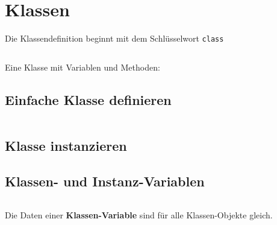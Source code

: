 
\begin{minipage}[t]{0.59\textwidth}
	\section{Klassen}
	Die Klassendefinition beginnt mit dem Schlüsselwort \texttt{class}
\end{minipage}
\begin{minipage}[t]{0.02\textwidth} $\quad$ \end{minipage}
\begin{minipage}[t]{0.39\textwidth}
	
\end{minipage}

\begin{minipage}[t]{0.59\textwidth}
	$\quad$\\[40pt]
	Eine Klasse mit Variablen und Methoden:
\end{minipage}\begin{minipage}[t]{0.02\textwidth}\end{minipage}
\begin{minipage}[t]{0.39\textwidth}
	
\end{minipage}

\begin{minipage}[t]{0.49\textwidth}
	\subsection{Einfache Klasse definieren}
	
\end{minipage}
\begin{minipage}[t]{0.02\textwidth} $\quad$ \end{minipage}
\begin{minipage}[t]{0.49\textwidth}
	\subsection{Klasse instanzieren}
	
\end{minipage}


\begin{minipage}[t]{0.49\textwidth}
	\subsection{Klassen- und Instanz-Variablen}
	
\end{minipage}
\begin{minipage}[t]{0.02\textwidth} $\quad$ \end{minipage}
\begin{minipage}[t]{0.49\textwidth}
	Die Daten einer \textbf{Klassen-Variable} sind für alle Klassen-Objekte gleich.
	
\end{minipage}\\[12pt]

